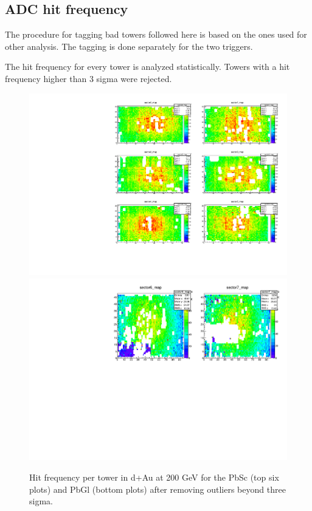 \documentclass{article}
\begin{document}
\subsection{ADC hit frequency}
The procedure for tagging bad towers followed here is based on the ones used for other analysis.
The tagging is done separately for the two triggers.

The hit frequency for every tower is analyzed statistically.
Towers with a hit frequency higher than 3 sigma were rejected.

\begin{figure}
  \centering
  \includegraphics[width=1\textwidth]{fig_pi0vn/sect_0-5_masked.pdf} \\
  \includegraphics[width=1\textwidth]{fig_pi0vn/sect_6-7_masked.pdf} 
  \caption{Hit frequency per tower in d+Au at 200 GeV for the PbSc (top six plots) and PbGl (bottom plots) after removing outliers beyond three sigma.}
  \label{sect05masked}
\end{figure}
\end{document}
